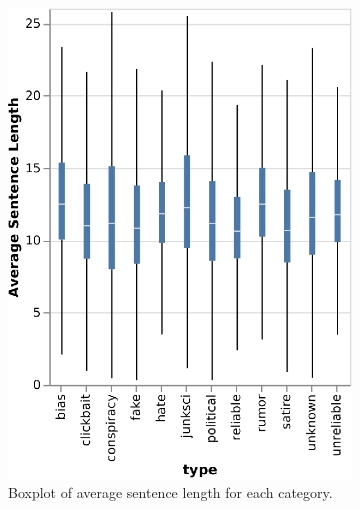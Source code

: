 \begin{figure}[h]
  \centering
  \begin{subfigure}[b]{0.4\textwidth}
    \includegraphics{chapter/images/data_exploration/boxplot_avgSentLen.eps}
    \caption{Boxplot of average sentence length for each category.}
  \end{subfigure}
  \hfill
  \begin{subfigure}[b]{0.4\textwidth}

\end{subfigure}
\end{figure}
